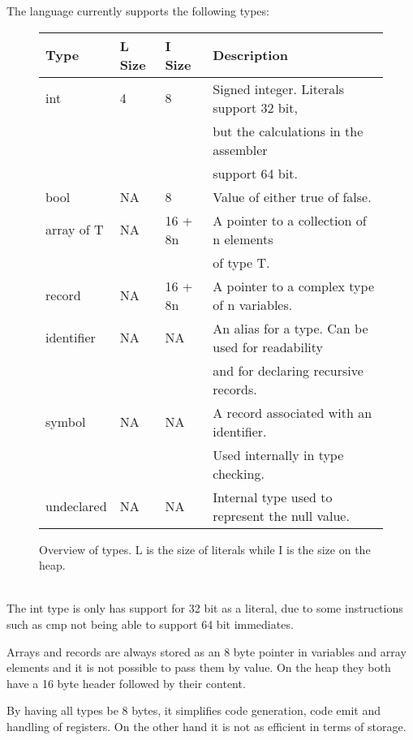 \documentclass{article}
\begin{document}
The language currently supports the following types:
\begin{figure}[h]
    \centering
    \begin{tabular}{| l | l | l | l |}
    \hline
    \textbf{Type}& \textbf{L Size} & \textbf{I Size} & \textbf{Description} \\
    
    \hline
    int & 4 & 8 & Signed integer. Literals support 32 bit, \\
     & & & but the calculations in the assembler \\
     & & & support 64 bit. \\
    \hline
    bool & NA & 8 & Value of either true of false.\\
    \hline
    array of T & NA & 16 + 8n & A pointer to a collection of n elements \\
    & & & of type T. \\
    \hline
    record & NA & 16 + 8n & A pointer to a complex type of n variables. \\
    \hline
    identifier & NA & NA & An alias for a type. Can be used for readability \\
    & & & and for declaring recursive records. \\
    \hline 
    symbol & NA & NA & A record associated with an identifier.\\
    & & & Used internally in type checking. \\
    \hline
    undeclared & NA & NA & Internal type used to represent the null value. \\
    \hline
    \end{tabular}

    \caption{Overview of types. L is the size of literals while I is the size on the heap. }
    \label{fig:my_label}
\end{figure}
\\
The int type is only has support for 32 bit as a literal, due to some instructions such as cmp not being able to support 64 bit immediates. 

Arrays and records are always stored as an 8 byte pointer in variables and array elements and it is not possible to pass them by value. On the heap they both have a 16 byte header followed by their content.

By having all types be 8 bytes, it simplifies code generation, code emit and handling of registers. On the other hand it is not as efficient in terms of storage.
\end{document}
